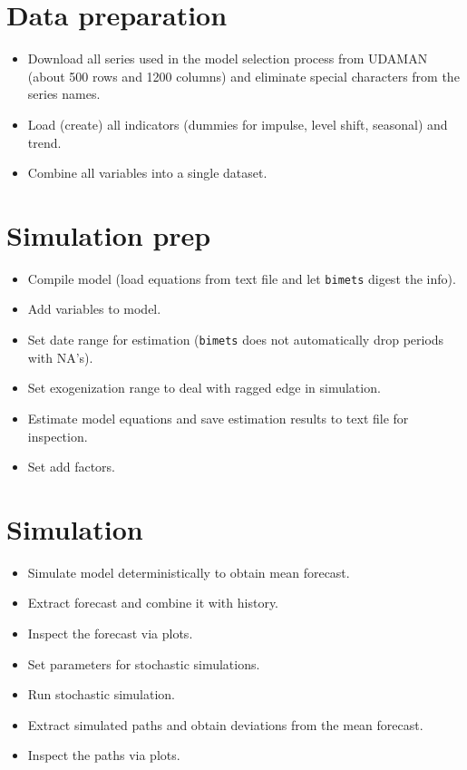 \documentclass[
  letterpaper,
  DIV=11,
  numbers=noendperiod]{scrreport}
\providecommand{\tightlist}{%
  \setlength{\itemsep}{0pt}\setlength{\parskip}{0pt}}\usepackage{longtable,booktabs,array}
\begin{document}
\hypertarget{data-preparation}{%
\section{Data preparation}\label{data-preparation}}

\begin{itemize}
\tightlist
\item
  Download all series used in the model selection process from UDAMAN
  (about 500 rows and 1200 columns) and eliminate special characters
  from the series names.\\
\item
  Load (create) all indicators (dummies for impulse, level shift,
  seasonal) and trend.\\
\item
  Combine all variables into a single dataset.
\end{itemize}

\hypertarget{simulation-prep}{%
\section{Simulation prep}\label{simulation-prep}}

\begin{itemize}
\tightlist
\item
  Compile model (load equations from text file and let \texttt{bimets}
  digest the info).
\item
  Add variables to model.
\item
  Set date range for estimation (\texttt{bimets} does not automatically
  drop periods with NA's).
\item
  Set exogenization range to deal with ragged edge in simulation.\\
\item
  Estimate model equations and save estimation results to text file for
  inspection.
\item
  Set add factors.
\end{itemize}

\hypertarget{simulation}{%
\section{Simulation}\label{simulation}}

\begin{itemize}
\tightlist
\item
  Simulate model deterministically to obtain mean forecast.
\item
  Extract forecast and combine it with history.
\item
  Inspect the forecast via plots.
\item
  Set parameters for stochastic simulations.
\item
  Run stochastic simulation.
\item
  Extract simulated paths and obtain deviations from the mean forecast.
\item
  Inspect the paths via plots.
\end{itemize}
\end{document}
